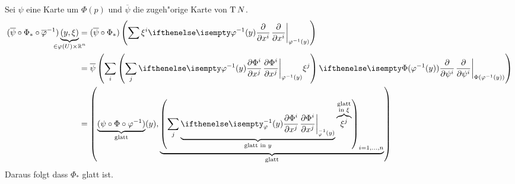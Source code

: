 \begin{Loes}
\begin{enumerate}[label=\alph*),widest=a,leftmargin=*]
	Sei $\psi$ eine Karte um $\Phi(p)$ und $\overline \psi$ die zugeh"orige Karte von $\operatorname{T} N$.
	\begin{align*}
		(\overline \psi \circ \Phi_* \circ \overline \varphi^{-1})\underbrace{(y, \xi)}_{\mathclap{\in \varphi(U) \X \R^n}} &= (\overline \psi \circ \Phi_*)\left(\sum \xi^{i} \pdifffrac[\varphi^{-1}(y)]{}{x^{i}}\right)\\
		&= \overline \psi\left(\sum_i\left(\sum_j \pdifffrac[\varphi^{-1}(y)]{\Phi^{i}}{x^j} \xi^j\right) \pdifffrac[\Phi(\varphi^{-1}(y))]{}{\psi^{i}}\right)\\
		&= \left( \underbrace{(\psi \circ \Phi \circ \varphi^{-1})}_{\text{glatt}}(y), \underbrace{\left( \sum_j \underbrace{\pdifffrac[_\varphi^{-1}(y)]{\Phi^{i}}{x^j}}_{\text{glatt in }y} \overbrace{\xi^j}^{\substack{\text{glatt}\\ \text{in }\xi}} \right)_{i = 1,\ldots ,n}}_{\text{glatt}} \right)
	\end{align*}
	Daraus folgt dass $\Phi_*$ glatt ist.
\end{enumerate}\end{Loes}

